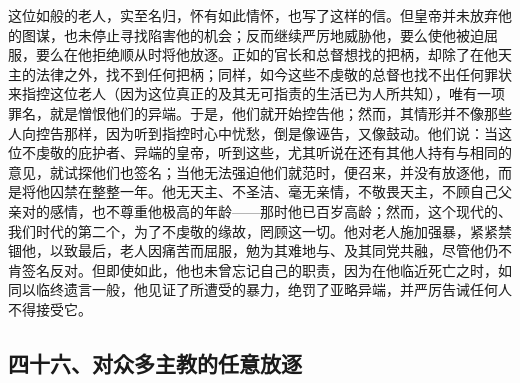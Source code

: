 这位如般的老人，实至名归，怀有如此情怀，也写了这样的信。但皇帝并未放弃他的图谋，也未停止寻找陷害他的机会；反而继续严厉地威胁他，要么使他被迫屈服，要么在他拒绝顺从时将他放逐。正如的官长和总督想找的把柄，却除了在他天主的法律之外，找不到任何把柄；同样，如今这些不虔敬的总督也找不出任何罪状来指控这位老人（因为这位真正的及其无可指责的生活已为人所共知），唯有一项罪名，就是憎恨他们的异端。于是，他们就开始控告他；然而，其情形并不像那些人向控告那样，因为听到指控时心中忧愁，倒是像诬告，又像鼓动。他们说：当这位不虔敬的庇护者、异端的皇帝，听到这些，尤其听说在还有其他人持有与相同的意见，就试探他们也签名；当他无法强迫他们就范时，便召来，并没有放逐他，而是将他囚禁在整整一年。他无天主、不圣洁、毫无亲情，不敬畏天主，不顾自己父亲对的感情，也不尊重他极高的年龄——那时他已百岁高龄；然而，这个现代的、我们时代的第二个，为了不虔敬的缘故，罔顾这一切。他对老人施加强暴，紧紧禁锢他，以致最后，老人因痛苦而屈服，勉为其难地与、及其同党共融，尽管他仍不肯签名反对。但即使如此，他也未曾忘记自己的职责，因为在他临近死亡之时，如同以临终遗言一般，他见证了所遭受的暴力，绝罚了亚略异端，并严厉告诫任何人不得接受它。\par


\subsection{四十六、对众多主教的任意放逐}

